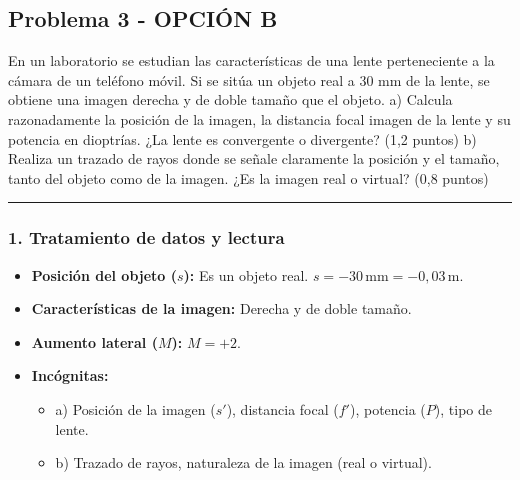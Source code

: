 \newpage

\subsection{Problema 3 - OPCIÓN B}
\label{subsec:3B_2015_jun_ord}

\begin{cajaenunciado}
En un laboratorio se estudian las características de una lente perteneciente a la cámara de un teléfono móvil. Si se sitúa un objeto real a 30 mm de la lente, se obtiene una imagen derecha y de doble tamaño que el objeto.
a) Calcula razonadamente la posición de la imagen, la distancia focal imagen de la lente y su potencia en dioptrías. ¿La lente es convergente o divergente? (1,2 puntos)
b) Realiza un trazado de rayos donde se señale claramente la posición y el tamaño, tanto del objeto como de la imagen. ¿Es la imagen real o virtual? (0,8 puntos)
\end{cajaenunciado}
\hrule

\subsubsection*{1. Tratamiento de datos y lectura}
\begin{itemize}
    \item \textbf{Posición del objeto ($s$):} Es un objeto real. $s = -30\,\text{mm} = -0,03\,\text{m}$.
    \item \textbf{Características de la imagen:} Derecha y de doble tamaño.
    \item \textbf{Aumento lateral ($M$):} $M = +2$.
    \item \textbf{Incógnitas:}
        \begin{itemize}
            \item a) Posición de la imagen ($s'$), distancia focal ($f'$), potencia ($P$), tipo de lente.
            \item b) Trazado de rayos, naturaleza de la imagen (real o virtual).
        \end{itemize}
\end{itemize}

